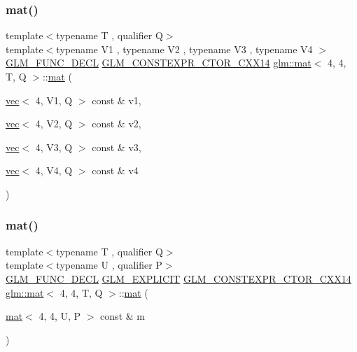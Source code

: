 \subsubsection{\texorpdfstring{mat()}{mat()}\hspace{0.1cm}{\footnotesize\ttfamily [8/21]}}
{\footnotesize\ttfamily template$<$typename T , qualifier Q$>$ \\
template$<$typename V1 , typename V2 , typename V3 , typename V4 $>$ \\
\mbox{\hyperlink{setup_8hpp_ab2d052de21a70539923e9bcbf6e83a51}{G\+L\+M\+\_\+\+F\+U\+N\+C\+\_\+\+D\+E\+CL}} \mbox{\hyperlink{setup_8hpp_a0900f9145e68bf6061b6f5e7be3fa751}{G\+L\+M\+\_\+\+C\+O\+N\+S\+T\+E\+X\+P\+R\+\_\+\+C\+T\+O\+R\+\_\+\+C\+X\+X14}} \mbox{\hyperlink{structglm_1_1mat}{glm\+::mat}}$<$ 4, 4, T, Q $>$\+::\mbox{\hyperlink{structglm_1_1mat}{mat}} (\begin{DoxyParamCaption}\item[{\mbox{\hyperlink{structglm_1_1vec}{vec}}$<$ 4, V1, Q $>$ const \&}]{v1,  }\item[{\mbox{\hyperlink{structglm_1_1vec}{vec}}$<$ 4, V2, Q $>$ const \&}]{v2,  }\item[{\mbox{\hyperlink{structglm_1_1vec}{vec}}$<$ 4, V3, Q $>$ const \&}]{v3,  }\item[{\mbox{\hyperlink{structglm_1_1vec}{vec}}$<$ 4, V4, Q $>$ const \&}]{v4 }\end{DoxyParamCaption})}

\mbox{\label{structglm_1_1mat_3_014_00_014_00_01_t_00_01_q_01_4_a72a3e030050c4da5ee1d208726898e70}} 
\subsubsection{\texorpdfstring{mat()}{mat()}\hspace{0.1cm}{\footnotesize\ttfamily [9/21]}}
{\footnotesize\ttfamily template$<$typename T , qualifier Q$>$ \\
template$<$typename U , qualifier P$>$ \\
\mbox{\hyperlink{setup_8hpp_ab2d052de21a70539923e9bcbf6e83a51}{G\+L\+M\+\_\+\+F\+U\+N\+C\+\_\+\+D\+E\+CL}} \mbox{\hyperlink{setup_8hpp_a6c74f5a5e7b134ab69023ff9a30d4d5d}{G\+L\+M\+\_\+\+E\+X\+P\+L\+I\+C\+IT}} \mbox{\hyperlink{setup_8hpp_a0900f9145e68bf6061b6f5e7be3fa751}{G\+L\+M\+\_\+\+C\+O\+N\+S\+T\+E\+X\+P\+R\+\_\+\+C\+T\+O\+R\+\_\+\+C\+X\+X14}} \mbox{\hyperlink{structglm_1_1mat}{glm\+::mat}}$<$ 4, 4, T, Q $>$\+::\mbox{\hyperlink{structglm_1_1mat}{mat}} (\begin{DoxyParamCaption}\item[{\mbox{\hyperlink{structglm_1_1mat}{mat}}$<$ 4, 4, U, P $>$ const \&}]{m }\end{DoxyParamCaption})}

